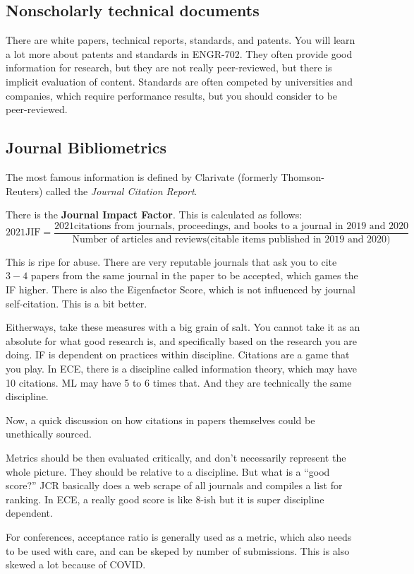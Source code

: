 \documentclass[10pt, oneside]{article}
\begin{document}
\subsection{Nonscholarly technical documents}
There are white papers, technical reports, standards, and patents. You will learn a lot more about patents and standards in ENGR-702. They often provide good information for research, but they are not really peer-reviewed, but there is implicit evaluation of content. Standards are often competed by universities and companies, which require performance results, but you should consider to be peer-reviewed. 
\subsection{Journal Bibliometrics}
The most famous information is defined by Clarivate (formerly Thomson-Reuters) called the \textit{Journal Citation Report}. 

There is the \textbf{Journal Impact Factor}. This is calculated as follows:
\[2021\text{JIF} = \frac{2021\text{citations from journals, proceedings, and books to a journal in 2019 and 2020}}{\text{Number of articles and reviews(citable items published in 2019 and 2020)}}\]

This is ripe for abuse. There are very reputable journals that ask you to cite $3-4$ papers from the same journal in the paper to be accepted, which games the IF higher. There is also the Eigenfactor Score, which is not influenced by journal self-citation. This is a bit better. 

Eitherways, take these measures with a big grain of salt. You cannot take it as an absolute for what good research is, and specifically based on the research you are doing. IF is dependent on practices within discipline. Citations are a game that you play. In ECE, there is a discipline called information theory, which may have 10 citations. ML may have 5 to 6 times that. And they are technically the same discipline. 

Now, a quick discussion on how citations in papers themselves could be unethically sourced. 

Metrics should be then evaluated critically, and don't necessarily represent the whole picture. They should be relative to a discipline. But what is a ``good score?'' JCR basically does a web scrape of all journals and compiles a list for ranking. In ECE, a really good score is like $8$-ish but it is super discipline dependent. 

For conferences, acceptance ratio is generally used as a metric, which also needs to be used with care, and can be skeped by number of submissions. This is also skewed a lot because of COVID.
\end{document}
